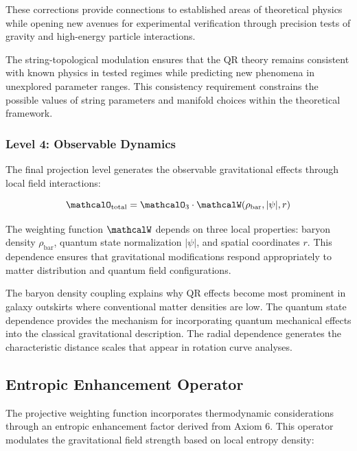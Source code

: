 These corrections provide connections to established areas of theoretical physics while opening new avenues for experimental verification through precision tests of gravity and high-energy particle interactions.

The string-topological modulation ensures that the QR theory remains consistent with known physics in tested regimes while predicting new phenomena in unexplored parameter ranges. This consistency requirement constrains the possible values of string parameters and manifold choices within the theoretical framework.

\subsubsection{Level 4: Observable Dynamics}
\label{subsubsec:level4-observable}

The final projection level generates the observable gravitational effects through local field interactions:

\begin{equation}
\mathcalO_{\text{total}} = \mathcalO_3 \cdot \mathcalW(\rho_{\text{bar}}, |\psi|, r)
\label{eq:level4-projection}
\end{equation}

The weighting function $\mathcalW$ depends on three local properties: baryon density $\rho_{\text{bar}}$, quantum state normalization $|\psi|$, and spatial coordinates $r$. This dependence ensures that gravitational modifications respond appropriately to matter distribution and quantum field configurations.

The baryon density coupling explains why QR effects become most prominent in galaxy outskirts where conventional matter densities are low. The quantum state dependence provides the mechanism for incorporating quantum mechanical effects into the classical gravitational description. The radial dependence generates the characteristic distance scales that appear in rotation curve analyses.

\subsection{Entropic Enhancement Operator}
\label{subsec:entropic-enhancement}

The projective weighting function incorporates thermodynamic considerations through an entropic enhancement factor derived from Axiom 6. This operator modulates the gravitational field strength based on local entropy density:

